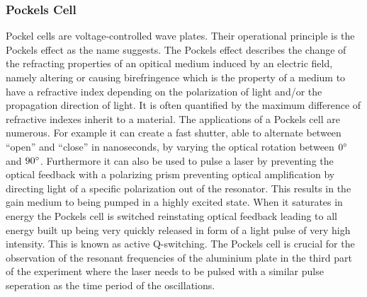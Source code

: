 \subsubsection{Pockels Cell}

Pockel cells are voltage-controlled wave plates. Their operational principle is the Pockels effect as the name suggests. The Pockels effect describes the change of the refracting properties of an opitical medium induced by an electric field, namely altering or causing birefringence which is the property of a medium to have a refractive index depending on the polarization of light and/or the propagation direction of light. It is often quantified by the maximum difference of refractive indexes inherit to a material. The applications of a Pockels cell are numerous. For example it can create a fast shutter, able to alternate between ``open'' and ``close'' in nanoseconds, by varying the optical rotation between $0^\circ$ and $90^\circ$. Furthermore it can also be used to pulse a laser by preventing the optical feedback with a polarizing prism preventing optical amplification by directing light of a specific polarization out of the resonator. This results in the gain medium to being pumped in a highly excited state. When it saturates in energy the Pockels cell is switched reinstating optical feedback leading to all energy built up being very quickly released in form of a light pulse of very high intensity. This is known as active Q-switching.
The Pockels cell is crucial for the observation of the resonant frequencies of the aluminium plate in the third part of the experiment where the laser needs to be pulsed with a similar pulse seperation as the time period of the oscillations.




